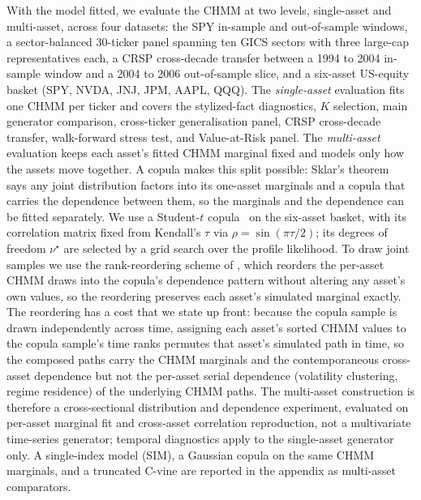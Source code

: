 With the model fitted, we evaluate the CHMM at two levels, single-asset and multi-asset, across four datasets: the SPY in-sample and out-of-sample windows, a sector-balanced 30-ticker panel spanning ten GICS sectors with three large-cap representatives each, a CRSP cross-decade transfer between a 1994 to 2004 in-sample window and a 2004 to 2006 out-of-sample slice, and a six-asset US-equity basket (SPY, NVDA, JNJ, JPM, AAPL, QQQ). The \emph{single-asset} evaluation fits one CHMM per ticker and covers the stylized-fact diagnostics, $K$ selection, main generator comparison, cross-ticker generalisation panel, CRSP cross-decade transfer, walk-forward stress test, and Value-at-Risk panel. The \emph{multi-asset} evaluation keeps each asset's fitted CHMM marginal fixed and models only how the assets move together. A copula makes this split possible: Sklar's theorem~\cite{sklar1959fonctions} says any joint distribution factors into its one-asset marginals and a copula that carries the dependence between them, so the marginals and the dependence can be fitted separately. We use a Student-$t$ copula~\cite{demarta2005tcopula, mcneil2015quantitative} on the six-asset basket, with its correlation matrix fixed from Kendall's $\tau$ via $\rho=\sin(\pi\tau/2)$; its degrees of freedom $\nu^\star$ are selected by a grid search over the profile likelihood. To draw joint samples we use the rank-reordering scheme of \citet{iman1982distribution}, which reorders the per-asset CHMM draws into the copula's dependence pattern without altering any asset's own values, so the reordering preserves each asset's simulated marginal exactly. The reordering has a cost that we state up front: because the copula sample is drawn independently across time, assigning each asset's sorted CHMM values to the copula sample's time ranks permutes that asset's simulated path in time, so the composed paths carry the CHMM marginals and the contemporaneous cross-asset dependence but not the per-asset serial dependence (volatility clustering, regime residence) of the underlying CHMM paths. The multi-asset construction is therefore a cross-sectional distribution and dependence experiment, evaluated on per-asset marginal fit and cross-asset correlation reproduction, not a multivariate time-series generator; temporal diagnostics apply to the single-asset generator only. A single-index model (SIM), a Gaussian copula on the same CHMM marginals, and a truncated C-vine are reported in the appendix as multi-asset comparators.

